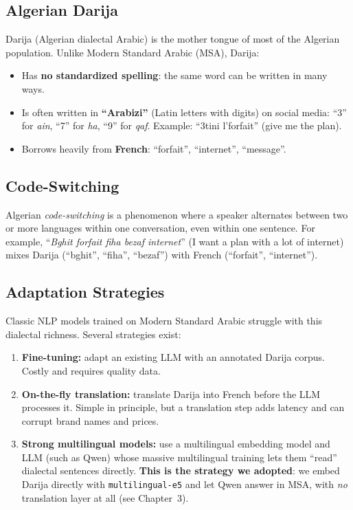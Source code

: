 \documentclass[12pt, a4paper]{report}
\newcommand{\humantext}[1]{#1}      %
\begin{document}
\subsection{Algerian Darija}
\humantext{Darija (Algerian dialectal Arabic) is the mother tongue of most of the Algerian population. Unlike Modern Standard Arabic (MSA), Darija:}
\begin{itemize}[noitemsep]
    \item \humantext{Has \textbf{no standardized spelling}: the same word can be written in many ways.}
    \item \humantext{Is often written in \textbf{``Arabizi''} (Latin letters with digits) on social media: ``3'' for \textit{ain}, ``7'' for \textit{ha}, ``9'' for \textit{qaf}. Example: ``3tini l'forfait'' (give me the plan).}
    \item \humantext{Borrows heavily from \textbf{French}: ``forfait'', ``internet'', ``message''.}
\end{itemize}

\subsection{Code-Switching}
\humantext{Algerian \textit{code-switching} is a phenomenon where a speaker alternates between two or more languages within one conversation, even within one sentence.} \humantext{For example, ``\textit{Bghit forfait fiha bezaf internet}'' (I want a plan with a lot of internet) mixes Darija (``bghit'', ``fiha'', ``bezaf'') with French (``forfait'', ``internet'').}

\subsection{Adaptation Strategies}
\humantext{Classic NLP models trained on Modern Standard Arabic struggle with this dialectal richness. Several strategies exist:}
\begin{enumerate}[noitemsep]
    \item \humantext{\textbf{Fine-tuning:} adapt an existing LLM with an annotated Darija corpus. Costly and requires quality data.}
    \item \humantext{\textbf{On-the-fly translation:} translate Darija into French before the LLM processes it. Simple in principle, but a translation step adds latency and can corrupt brand names and prices.}
    \item \humantext{\textbf{Strong multilingual models:} use a multilingual embedding model and LLM (such as Qwen) whose massive multilingual training lets them ``read'' dialectal sentences directly. \textbf{This is the strategy we adopted}: we embed Darija directly with \texttt{multilingual-e5} and let Qwen answer in MSA, with \emph{no} translation layer at all (see Chapter~3).}
\end{enumerate}
\end{document}
